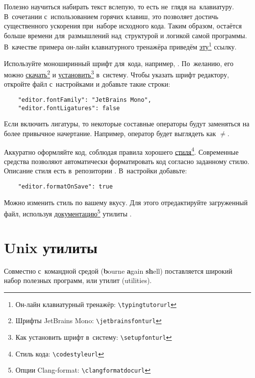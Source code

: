 Полезно научиться набирать текст вслепую, то есть не~глядя на~клавиатуру. В~сочетании с~использованием горячих клавиш, это позволяет достичь существенного ускорения при~наборе исходного кода. Таким образом, остаётся больше времени для~размышлений над~структурой и логикой самой программы. В~качестве примера он-лайн клавиатурного тренажёра приведём \href{\typingtutorurl}{эту}\footnote{Он-лайн клавиатурный тренажёр: \nolinkurl{\typingtutorurl}} ссылку.

Используйте моноширинный шрифт для~кода, например, . По~желанию, его можно \href{\jetbrainsfonturl}{скачать}\footnote{Шрифты JetBrains Mono: \nolinkurl{\jetbrainsfonturl}} и \href{\setupfonturl}{установить}\footnote{Как установить шрифт в~систему: \nolinkurl{\setupfonturl}} в~систему. Чтобы указать шрифт редактору, откройте файл с~настройками  и добавьте такие строки:
\begin{verbatim}
    "editor.fontFamily": "JetBrains Mono",
    "editor.fontLigatures": false
\end{verbatim}
\noindent Если включить лигатуры, то некоторые составные операторы будут заменяться на более привычное начертание. Например, оператор \code{!=} будет выглядеть как \(\neq\).

Аккуратно оформляйте код, соблюдая правила хорошего \href{\codestyleurl}{стиля}\footnote{Стиль кода: \nolinkurl{\codestyleurl}}. Современные средства позволяют автоматически форматировать код согласно заданному стилю. Описание стиля есть в~репозитории . В~настройки добавьте:

\begin{verbatim}
    "editor.formatOnSave": true
\end{verbatim}

Можно изменить стиль по вашему вкусу. Для этого отредактируйте загруженный файл, используя \href{\clangformatdocurl}{документацию}\footnote{Опции Clang-format: \nolinkurl{\clangformatdocurl}} утилиты .



\section{Unix утилиты}\label{sect:utils}
Совместно с~командной средой  (\textenglish{\textbf{b}ourne \textbf{a}gain \textbf{sh}ell}) поставляется широкий набор полезных программ, или утилит (\textenglish{utilities}).


